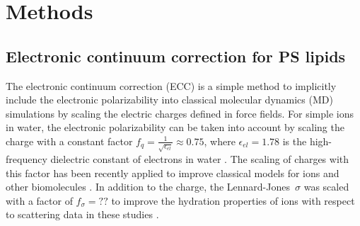 \documentclass[journal=jpcbfk,manuscript=article]{achemso}
\begin{document}





 
\section{Methods} 
 
\subsection{Electronic continuum correction for PS lipids}\label{section:ecc} 

The electronic continuum correction (ECC) is a simple method to implicitly include
the electronic polarizability into classical molecular dynamics (MD) simulations
by scaling the electric charges defined in force fields.
For simple ions in water, the electronic polarizability
can be taken into account by scaling the charge with a constant factor 
 $ f_q = \frac{1}{\sqrt{\epsilon_{el}}} \approx 0.75$,
where  $\epsilon_{el} = 1.78$ is the high-frequency dielectric constant of electrons in water \cite{leontyev09}.
The scaling of charges with this factor has been recently applied to improve classical models for ions and
other biomolecules \cite{Pluharova2014, martinek17} .
In addition to the charge, the Lennard-Jones~$\sigma$ was scaled with a factor of $f_\sigma = ??$
to improve the hydration properties of ions with respect to scattering data in these studies
.
\end{document}
